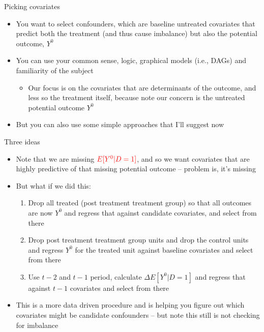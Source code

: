 \documentclass{beamer}
\begin{document}
\begin{frame}{Picking covariates}

\begin{itemize}
\item You want to select confounders, which are baseline untreated covariates that predict both the treatment (and thus cause imbalance) but also the potential outcome, $Y^0$
\item You can use your common sense, logic, graphical models (i.e., DAGs) and familiarity of the subject 
	\begin{itemize}
	\item Our focus is on the covariates that are determinants of the outcome, and less so the treatment itself, because note our concern is the untreated potential outcome $Y^0$
	\end{itemize}
\item But you can also use some simple approaches that I'll suggest now
\end{itemize}

\end{frame}

\begin{frame}{Three ideas}

\begin{itemize}
\item Note that we are missing $\textcolor{red}{E[Y^0|D=1]}$, and so we want covariates that are highly predictive of that missing potential outcome -- problem is, it's missing
\item But what if we did this:
	\begin{enumerate}
	\item Drop all treated (post treatment treatment group) so that all outcomes are now $Y^0$ and regress that against candidate covariates, and select from there
	\item Drop post treatment treatment group units and drop the control units and regress $Y^0$ for the treated unit against baseline covariates and select from there
	\item Use $t-2$ and $t-1$ period, calculate $\Delta E[Y^0|D=1]$ and regress that against $t-1$ covariates and select from there
	\end{enumerate}
\item This is a more data driven procedure and is helping you figure out which covariates might be candidate confounders -- but note this still is not checking for imbalance
\end{itemize}

\end{frame}
\end{document}
